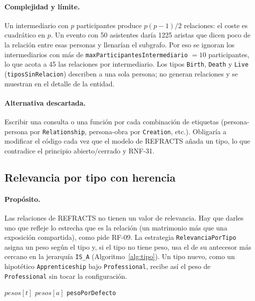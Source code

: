 \paragraph{Complejidad y límite.} Un intermediario con $p$ participantes produce $p(p-1)/2$ relaciones: el coste es cuadrático en $p$. Un evento con 50 asistentes daría 1225 aristas que dicen poco de la relación entre esas personas y llenarían el subgrafo. Por eso se ignoran los intermediarios con más de \texttt{maxParticipantesIntermediario} $=10$ participantes, lo que acota a 45 las relaciones por intermediario. Los tipos \texttt{Birth}, \texttt{Death} y \texttt{Live} (\texttt{tiposSinRelacion}) describen a una sola persona; no generan relaciones y se muestran en el detalle de la entidad.

\paragraph{Alternativa descartada.} Escribir una consulta o una función por cada combinación de etiquetas (persona-persona por \texttt{Relationship}, persona-obra por \texttt{Creation}, etc.). Obligaría a modificar el código cada vez que el modelo de REFRACTS añada un tipo, lo que contradice el principio abierto/cerrado y RNF-31.

\subsection{Relevancia por tipo con herencia}
\label{sec:alg-tipo}

\paragraph{Propósito.} Las relaciones de REFRACTS no tienen un valor de relevancia. Hay que darles uno que refleje lo estrecha que es la relación (un matrimonio más que una exposición compartida), como pide RF-09. La estrategia \texttt{RelevanciaPorTipo} asigna un peso según el tipo y, si el tipo no tiene peso, usa el de su antecesor más cercano en la jerarquía \texttt{IS\_A} (Algoritmo~\ref{alg:tipo}). Un tipo nuevo, como un hipotético \texttt{Apprenticeship} bajo \texttt{Professional}, recibe así el peso de \texttt{Professional} sin tocar la configuración.

\begin{algorithm}[htbp]
  \caption{Relevancia de un tipo (\texttt{calcular\_relevancia} de \texttt{RelevanciaPorTipo}).}
  \label{alg:tipo}
  \begin{algorithmic}[1]
       \State \Return $pesos[t]$ \EndIf
       
         \State \Return $pesos[a]$ \EndIf
      \EndFor
      \State \Return \texttt{pesoPorDefecto} 
    \EndFunction
  \end{algorithmic}
\end{algorithm}

